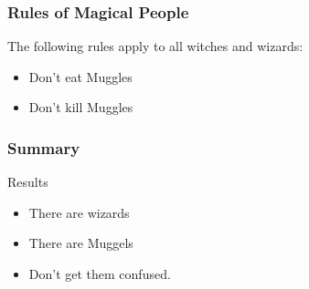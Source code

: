 \documentclass[aspectratio=169]{beamer}
\begin{document}
\begin{frame}
\frametitle{Rules of Magical People}

The following rules apply to all witches and wizards:
\begin{itemize}
\item Don't eat Muggles
\item Don't kill Muggles
\end{itemize}

\end{frame}

\begin{frame}
\frametitle{Summary}

\begin{block}{Results}
\begin{itemize}
	\item There are wizards
	\item There are Muggels
	\pause
	\item Don't get them confused.
\end{itemize}
\end{block}

\end{frame}
 
\end{document}
